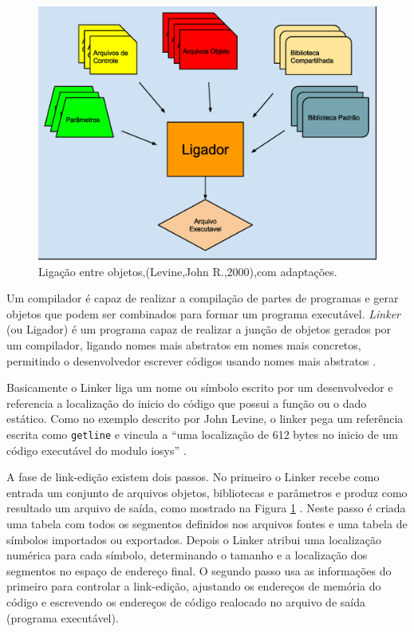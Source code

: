 \begin{figure}[h]
    \centering
        \includegraphics[keepaspectratio=true,scale=0.5]{figuras/ligador.eps}
    \caption{Ligação entre objetos,(Levine,John R.,2000),com adaptações.}
    \label{fig03}
\end{figure}

Um compilador é capaz de realizar a compilação de partes de programas e gerar
 objetos que podem ser combinados para formar um programa executável. 
\textit{Linker} (ou Ligador) é um programa capaz de realizar a junção 
de objetos gerados por um compilador, ligando nomes mais abstratos em nomes
 mais concretos, permitindo o desenvolvedor escrever códigos usando nomes 
mais abstratos \cite{ref36}.


 Basicamente o Linker liga um nome ou símbolo escrito por um desenvolvedor e
 referencia a localização do inicio do código que possui a função ou o dado
 estático. Como no exemplo descrito por John Levine, o linker pega um 
referência escrita como \texttt{getline}  e vincula a “uma localização de 612 bytes 
no inicio de um código executável do modulo iosys” \cite{ref36}. 

A fase de link-edição existem dois passos. No primeiro o Linker recebe como 
entrada um conjunto de arquivos objetos, bibliotecas e parâmetros e produz
 como resultado um arquivo de saída, como mostrado na Figura \ref{fig03}
 \cite{ref37}. Neste passo é criada uma tabela com 
todos os segmentos definidos nos arquivos fontes e uma tabela de símbolos 
importados ou exportados. Depois o Linker atribui uma localização numérica 
para cada símbolo, determinando o tamanho e a localização dos segmentos no
 espaço de endereço final. O segundo passo usa as informações do primeiro
 para controlar a link-edição, ajustando os endereços de memória do código e
 escrevendo os endereços de código realocado no arquivo de saída
 (programa executável).


